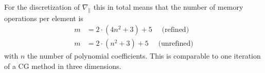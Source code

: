 For the discretization of $\nabla_\parallel$ this in total means that the number
of memory operations per element is
\begin{align}
m &= 2\cdot(4n^2+3)+5\quad \text{ (refined)} \\
m &= 2\cdot(n^2+3)+5\quad \text{ (unrefined)}
\end{align}
with $n$ the number of polynomial coefficients.
This is comparable to one iteration of a CG method in three dimensions.










